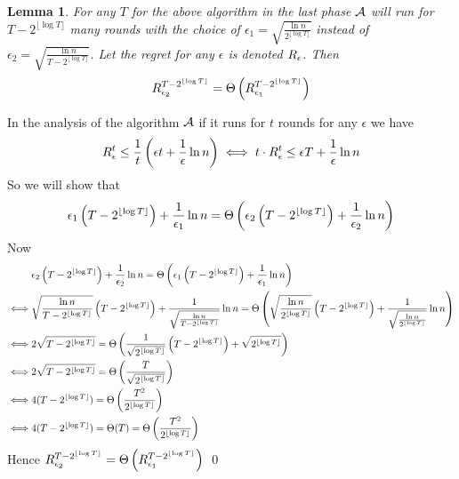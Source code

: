 \documentclass[a4paper, 11pt]{article}
\newtheorem{lemma}{Lemma}
\renewenvironment{proof}{\noindent{\it \textbf{Proof:}}\hspace*{1em}}{\qed\bigskip\\}
\begin{document}
{\begin{lemma}
	For any $T$ for the above  algorithm  in the last phase $\mathcal{A}$ will run for $T-2^{\lfloor\log T\rfloor}$ many rounds  with the choice of 
	$\epsilon_1=\sqrt{\frac{\ln n}{2^{\lfloor\log T\rfloor}}}$ 
	instead of 
	$\epsilon_2=\sqrt{\frac{\ln n}{T-2^{\lfloor\log T\rfloor}}}$. 
	Let the regret for any $\epsilon $ is denoted $R_{\epsilon}$. Then $$R^{T-2^{\lfloor\log T\rfloor}}_{\epsilon_2}=\Theta\left(R^{T-2^{\lfloor\log T\rfloor}}_{\epsilon_1}\right)$$
\end{lemma}
\begin{proof}
	In the analysis of the algorithm $\mathcal{A}$ if it runs for $t$ rounds for any $\epsilon $ we have $$R_{\epsilon}^t\leq \frac1t\left(\epsilon t+\frac1{\epsilon}\ln n\right)\iff t\cdot R_{\epsilon}^t\leq \epsilon T+\frac1{\epsilon}\ln n$$So we will show that $$\epsilon_1\left(T-2^{\lfloor\log T\rfloor}\right)+\frac1{\epsilon_1}\ln n=\Theta\left(\epsilon_2\left(T-2^{\lfloor\log T\rfloor}\right)+\frac1{\epsilon_2}\ln n\right)$$
	Now\begin{align*}
	&	\epsilon_2\left(T-2^{\lfloor\log T\rfloor}\right)+\frac1{\epsilon_2}\ln n=\Theta\left(\epsilon_1\left(T-2^{\lfloor\log T\rfloor}\right)+\frac1{\epsilon_1}\ln n\right)\\
	\iff & \sqrt{\frac{\ln n}{T-2^{\lfloor\log T\rfloor}}}\left(T-2^{\lfloor\log T\rfloor}\right)+\frac1{\sqrt{\frac{\ln n}{T-2^{\lfloor\log T\rfloor}}}}\ln n=\Theta\left(\sqrt{\frac{\ln n}{2^{\lfloor\log T\rfloor}}}\left(T-2^{\lfloor\log T\rfloor}\right)+\frac1{\sqrt{\frac{\ln n}{2^{\lfloor\log T\rfloor}}}}\ln n\right)\\
	\iff & 2\sqrt{T-2^{\lfloor\log T\rfloor}}=\Theta\left(  \frac1{\sqrt{2^{\lfloor\log T\rfloor}}} \left(T-2^{\lfloor\log T\rfloor}\right) +\sqrt{2^{\lfloor\log T\rfloor}}\right)\\
	\iff & 2\sqrt{T-2^{\lfloor\log T\rfloor}}=\Theta\left(  \frac{T}{\sqrt{2^{\lfloor\log T\rfloor}}} \right)\\
	\iff & 4(T-2^{\lfloor\log T\rfloor})=\Theta\left(\frac{T^2}{2^{\lfloor\log T\rfloor}}\right)\\
	\iff & 4(T-2^{\lfloor\log T\rfloor})=\Theta (T)=\Theta\left(\frac{T^2}{2^{\lfloor\log T\rfloor}}\right)
	\end{align*}
Hence $R^{T-2^{\lfloor\log T\rfloor}}_{\epsilon_2}=\Theta\left(R^{T-2^{\lfloor\log T\rfloor}}_{\epsilon_1}\right)$
\end{proof}

}
\end{document}
